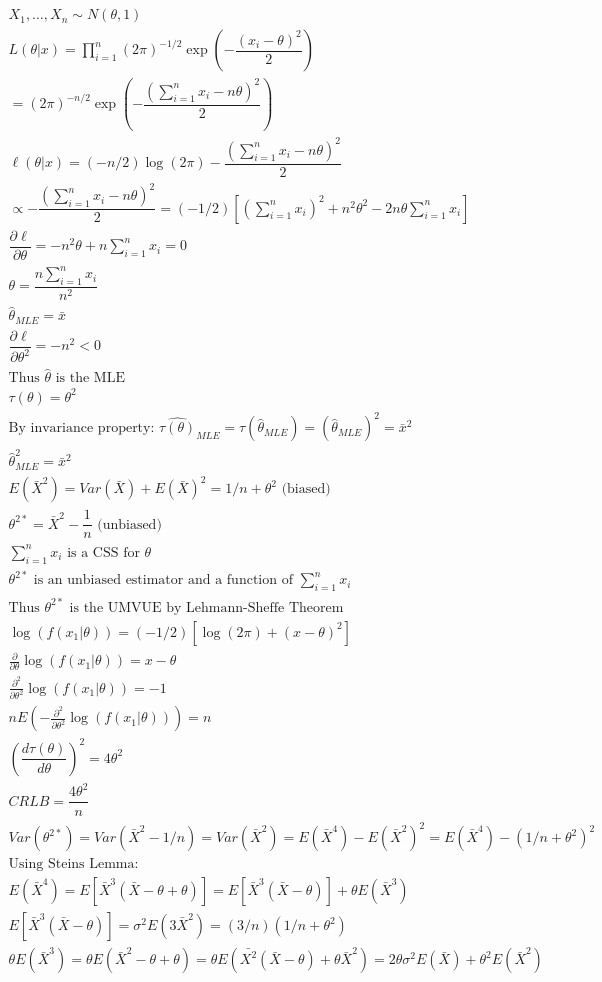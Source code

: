 \documentclass{article}
\newcommand{\pderiv}[2]{\frac{\partial #1}{\partial #2}}
\newcommand{\sg}{\sigma}
\newcommand{\sumn}{\sum_{i=1}^{n}}
\newcommand{\hth}{\hat{\theta}}
\newcommand{\prodn}{\prod_{i=1}^{n}}
\newcommand{\dll}[1]{\dfrac{\partial\ell}{\partial{#1}}}
\newcommand{\mle}{\hat{\theta}_{MLE}}
\newcommand{\sumx}{\sum_{i=1}^{n}x_i}
\newcommand{\ta}{\theta}
\newcommand{\dt}{\pderiv{}{\ta}}
\newcommand{\dtt}{\pderiv{^2}{\ta^2}}
\newcommand{\lt}[1]{\log(f(#1|\ta))}
\newcommand{\dtau}{\left(\dfrac{d\tau(\ta)}{d \ta}\right)^2}
\begin{document}
\begin{flushleft}
\begin{multline*}\\
X_1,\dots,X_n \sim N(\ta,1)\\
L(\ta|x)=\prodn(2\pi)^{-1/2}\exp\left(-\dfrac{(x_i-\ta)^2}{2}\right)\\
=(2\pi )^{-n/2}\exp\left(-\dfrac{(\sumn x_i-n\ta)^2}{2}\right)\\
\ell(\ta|x)=(-n/2)\log(2\pi )-\dfrac{(\sumn x_i-n\ta)^2}{2}\\
\propto -\dfrac{(\sumn x_i-n\ta)^2}{2}=(-1/2)\left[(\sumx)^2+n^2\ta^2-2n\ta\sumx \right]\\
\dll{\ta}=-n^2\ta+n\sumx=0\\
\ta=\dfrac{n\sumx}{n^2}\\
\mle=\bar{x}\\
\dll{\ta^2}=-n^2<0\\
\text{Thus } \hth \text{ is the MLE}\\
\tau(\ta)=\ta^2\\
\text{By invariance property: } \hat{\tau(\ta)}_{MLE}=\tau(\hth_{MLE})=(\hth_{MLE})^2=\bar{x}^2\\
\hth^2_{MLE}=\bar{x}^2\\
E(\bar{X}^2)=Var(\bar{X})+E(\bar{X})^2=1/n+\ta^2 \text{ (biased)}\\
\ta^{2*}=\bar{X}^2-\dfrac{1}{n} \text{ (unbiased)}\\
\sumx \text{ is a CSS for } \ta\\
\ta^{2*} \text{ is an unbiased estimator and a function of } \sumx\\
\text{Thus } \ta^{2*} \text{ is the UMVUE by Lehmann-Sheffe Theorem}\\
\log(f(x_1|\ta))=(-1/2)[\log(2\pi)+(x-\ta)^2]\\
\dt \lt{x_1}=x-\ta\\
\dtt \lt{x_1}=-1\\
nE(-\dtt \lt{x_1})=n\\
\dtau=4\ta^2\\
CRLB=\dfrac{4\ta^2}{n}\\
Var(\ta^{2*})=Var(\bar{X}^2-1/n)=Var(\bar{X}^2)=E(\bar{X}^4)-E(\bar{X}^2)^2=E(\bar{X}^4)-(1/n+\ta^2)^2\\
\text{Using Steins Lemma:}\\
E(\bar{X}^4)=E[\bar{X}^3(\bar{X}-\ta+\ta)]=E[\bar{X}^3(\bar{X}-\ta)]+\ta E(\bar{X}^3)\\
E[\bar{X}^3(\bar{X}-\ta)]=\sigma^2E(3\bar{X}^2)=(3/n)(1/n+\ta^2)\\
\ta E(\bar{X}^3)=\ta E(\bar{X}^2-\ta+\ta)= \ta E(\bar{X^2}(\bar{X}-\ta)+\ta\bar{X}^2)=2\ta\sg^2E(\bar{X})+\ta^2 E(\bar{X}^2)\\

\end{multline*}
\end{flushleft}
\end{document}
